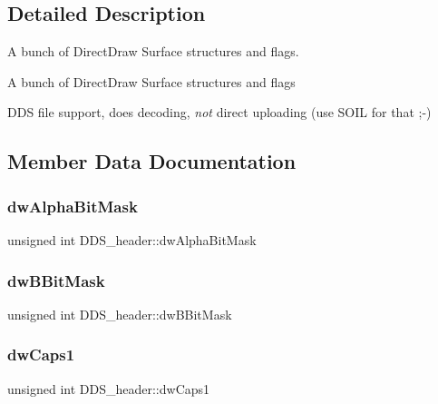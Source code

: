 \subsection{Detailed Description}
A bunch of Direct\+Draw Surface structures and flags. 

A bunch of Direct\+Draw Surface structures and flags

D\+DS file support, does decoding, {\itshape not} direct uploading (use S\+O\+IL for that ;-\/) 

\subsection{Member Data Documentation}
\mbox{\label{struct_d_d_s__header_a8b76af28a7317ab7b55ba48b864a026f}} 
\subsubsection{\texorpdfstring{dw\+Alpha\+Bit\+Mask}{dwAlphaBitMask}}
{\footnotesize\ttfamily unsigned int D\+D\+S\+\_\+header\+::dw\+Alpha\+Bit\+Mask}

\mbox{\label{struct_d_d_s__header_a960622af444650695e6714fca3b9dd91}} 
\subsubsection{\texorpdfstring{dw\+B\+Bit\+Mask}{dwBBitMask}}
{\footnotesize\ttfamily unsigned int D\+D\+S\+\_\+header\+::dw\+B\+Bit\+Mask}

\mbox{\label{struct_d_d_s__header_a449d945474e5ab417a18cdad14196b5c}} 
\subsubsection{\texorpdfstring{dw\+Caps1}{dwCaps1}}
{\footnotesize\ttfamily unsigned int D\+D\+S\+\_\+header\+::dw\+Caps1}

